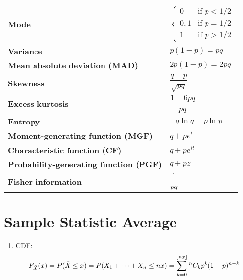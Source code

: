 \begin{longtable}{|m{6cm}|p{9cm}|}
    \textbf{Mode} & 
    ${\displaystyle {\begin{cases}0&{\text{if }}p<1/2\\0,1&{\text{if }}p=1/2\\1&{\text{if }}p>1/2\end{cases}}}$
    \\ \hline

    \textbf{Variance} &
    ${\displaystyle p(1-p)=pq}$
    \\ \hline

    \textbf{Mean absolute deviation (MAD)} &
    ${\displaystyle 2p(1-p)=2pq}$
    \\[1ex] \hline

    \textbf{Skewness} &
    ${\displaystyle {\dfrac {q-p}{\sqrt {pq}}}}$
    \\ \hline

    \textbf{Excess kurtosis} &
    ${\displaystyle {\dfrac {1-6pq}{pq}}}$
    \\ \hline

    \textbf{Entropy} &
    ${\displaystyle -q\ln q-p\ln p}$
    \\[1ex] \hline

    \textbf{Moment-generating function (MGF)} &
    ${\displaystyle q+pe^{t}}$
    \\[1ex] \hline

    \textbf{Characteristic function (CF)} &
    ${\displaystyle q+pe^{it}}$
    \\[1ex] \hline

    \textbf{Probability-generating function (PGF)} &
    ${\displaystyle q+pz}$
    \\[1ex] \hline

    \textbf{Fisher information} &
    ${\displaystyle {\dfrac {1}{pq}}}$
    \\[1ex] \hline


\end{longtable}
\renewcommand{\arraystretch}{1}

\section{Sample Statistic Average \cite{ism-1}} \label{Bernoulli Distribution: Sample Statistic Average}

\begin{enumerate}
    \item CDF:
    \[
        F_{\bar{X}}(x)
        = P(\bar{X} \leq x)
        = P(X_1 + \cdots + X_n \leq nx)
        = \displaystyle\sum_{k=0}^{\left \lfloor nx \right \rfloor} {^n}C_k p^k (1-p)^{n-k}
    \]

\end{enumerate}

